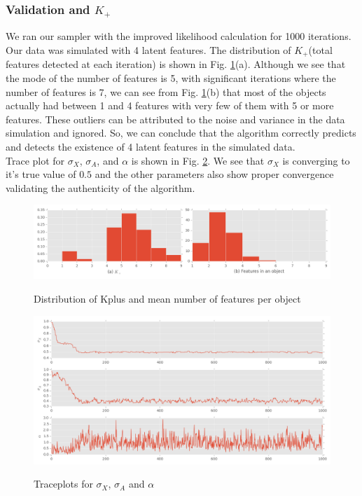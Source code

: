 \documentclass{article}
\begin{document}
\subsubsection{Validation and $K_+$}
We ran our sampler with the improved likelihood calculation for 1000 iterations. Our data was simulated with 4 latent features. The distribution of $K_+$(total features detected at each iteration) is shown in Fig. \ref{fig:dist}(a). Although we see that the mode of the number of features is 5, with significant iterations where the number of features is 7, we can see from Fig. \ref{fig:dist}(b) that most of the objects actually had between 1 and 4 features with very few of them with 5 or more features. These outliers can be attributed to the noise and variance in the data simulation and ignored. So, we can conclude that the algorithm correctly predicts and detects the existence of 4 latent features in the simulated data.\\
Trace plot for $\sigma_X$, $\sigma_A$, and $\alpha$ is shown in Fig. \ref{fig:trace}. We see that $\sigma_X$ is converging to it's true value of $0.5$ and the other parameters also show proper convergence validating the authenticity of the algorithm.\\ 
\begin{figure}[ht]
\caption {Distribution of Kplus and mean number of features per object}
\includegraphics[width=\linewidth]{figures/kDistribution.png}
\label{fig:dist}
\end{figure}

\begin{figure}[ht]
\caption {Traceplots for $\sigma_X$, $\sigma_A$ and $\alpha$}
\includegraphics[width=\linewidth]{figures/Trace.png}
\label{fig:trace}
\end{figure}
\end{document}
